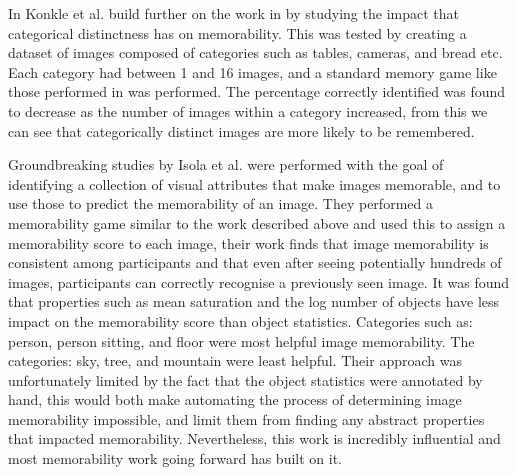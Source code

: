 \documentclass{UoYCSproject}
\begin{document}

In \cite{KonkleDistinct} Konkle et al. build further on the work in \cite{standing10000pictures, brady2008visual} by studying the impact that categorical distinctness has on memorability. This was tested by creating a dataset of images composed of categories such as tables, cameras, and bread etc. Each category had between 1 and 16 images, and a standard memory game like those performed in \cite{NickersonShortTermMemory, standing10000pictures, brady2008visual}
was performed. The percentage correctly identified was found to decrease as the number of images within a category increased, from this we can see that categorically distinct images are more likely to be remembered. 

Groundbreaking studies by Isola et al. \cite{Isola2011, IsolaParikhTorralbaOliva2011} were performed with the goal of identifying a collection of visual attributes that make images memorable, and to use those to predict the memorability of an image.
They performed a memorability game similar to the work described above and used this to assign a memorability score to each image, their work finds that image memorability is consistent among participants and that even after seeing potentially hundreds of images, participants can correctly recognise a previously seen image.
It was found that properties such as mean saturation and the log number of objects have less impact on the memorability score than object statistics.  Categories such as: person, person sitting, and floor were most helpful image memorability. The categories: sky, tree, and mountain were least helpful.
Their approach was unfortunately limited by the fact that the object statistics were annotated by hand, this would both make automating the process of determining image memorability impossible, and limit them from finding any abstract properties that impacted memorability. Nevertheless, this work is incredibly influential and most memorability work going forward has built on it.
\end{document}
